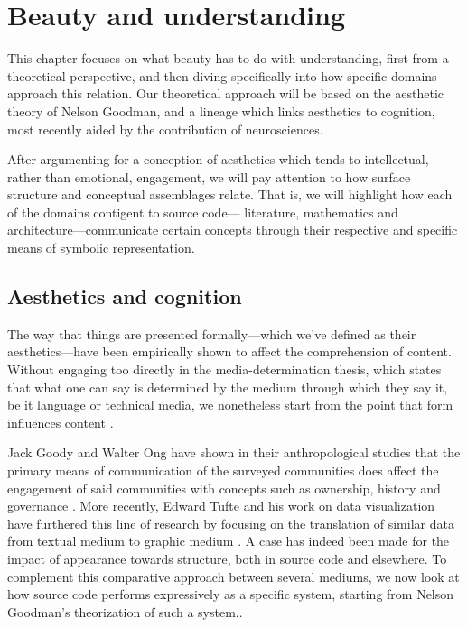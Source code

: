 \chapter{Beauty and understanding}
\label{chap:beauty}


This chapter focuses on what beauty has to do with understanding, first from a theoretical perspective, and then diving specifically into how specific domains approach this relation. Our theoretical approach will be based on the aesthetic theory of Nelson Goodman, and a lineage which links aesthetics to cognition, most recently aided by the contribution of neurosciences.

After argumenting for a conception of aesthetics which tends to intellectual, rather than emotional, engagement, we will pay attention to how surface structure and conceptual assemblages relate. That is, we will highlight how each of the domains contigent to source code— literature, mathematics and architecture—communicate certain concepts through their respective and specific means of symbolic representation.

\section{Aesthetics and cognition}
\label{sec:aesthetic-cognition}


The way that things are presented formally—which we've defined as their aesthetics—have been empirically shown to affect the comprehension of content. Without engaging too directly in the media-determination thesis, which states that what one can say is determined by the medium through which they say it, be it language or technical media, we nonetheless start from the point that form influences content \citep{postman_amusing_1985}.

Jack Goody and Walter Ong have shown in their anthropological studies that the primary means of communication of the surveyed communities does affect the engagement of said communities with concepts such as ownership, history and governance \citep{ong_orality_2012,goody_logic_1986}. More recently, Edward Tufte and his work on data visualization have furthered this line of research by focusing on the translation of similar data from textual medium to graphic medium \citep{tufte_visual_2001}. A case has indeed been made for the impact of appearance towards structure, both in source code and elsewhere. To complement this comparative approach between several mediums, we now look at how source code performs expressively as a specific system, starting from Nelson Goodman's theorization of such a system..

